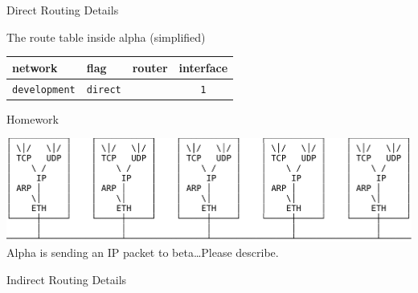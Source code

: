\begin{frame}{Direct Routing Details}
  \begin{center}
  \end{center}

  \begin{iblock}{The route table inside alpha (simplified)}
    \begin{center}
      \begin{tabular}{llcc}
        \toprule
        network & flag & router & interface\\\midrule
        \texttt{development} & \texttt{direct} & & \texttt{1}\\\bottomrule
      \end{tabular}
    \end{center}
  \end{iblock}
\end{frame}

\begin{frame}{Homework}
  \begin{center}
    \includegraphics[width=\textwidth]{eth}\\[2em]
    Alpha is sending an IP packet to beta\ldots{}Please describe.
  \end{center}
\end{frame}
  
\begin{frame}{Indirect Routing Details}\label{indirect-routing-2}
  \begin{center}
  \end{center}
\end{frame}

